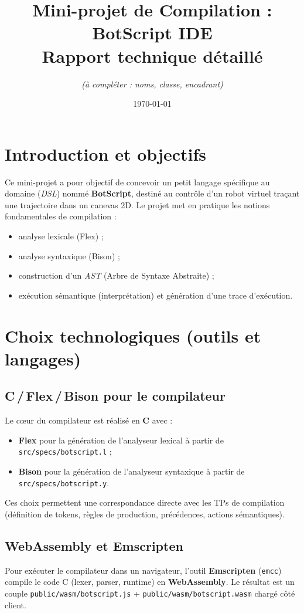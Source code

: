 \documentclass[11pt,a4paper]{article}
\title{\textbf{Mini-projet de Compilation : BotScript IDE}\\\large Rapport technique détaillé}
\author{\textit{(à compléter : noms, classe, encadrant)}}
\date{\today}
\begin{document}
\maketitle

\section{Introduction et objectifs}
Ce mini-projet a pour objectif de concevoir un petit langage spécifique au domaine (\emph{DSL}) nommé \textbf{BotScript}, destiné au contrôle d'un robot virtuel traçant une trajectoire dans un canevas 2D. Le projet met en pratique les notions fondamentales de compilation :
\begin{itemize}
  \item analyse lexicale (Flex) ;
  \item analyse syntaxique (Bison) ;
  \item construction d'un \emph{AST} (Arbre de Syntaxe Abstraite) ;
  \item exécution sémantique (interprétation) et génération d'une trace d'exécution.
\end{itemize}

\section{Choix technologiques (outils et langages)}
\subsection{C\,/\,Flex\,/\,Bison pour le compilateur}
Le cœur du compilateur est réalisé en \textbf{C} avec :
\begin{itemize}
  \item \textbf{Flex} pour la génération de l'analyseur lexical à partir de \texttt{src/specs/botscript.l} ;
  \item \textbf{Bison} pour la génération de l'analyseur syntaxique à partir de \texttt{src/specs/botscript.y}.
\end{itemize}
Ces choix permettent une correspondance directe avec les TPs de compilation (définition de tokens, règles de production, précédences, actions sémantiques).

\subsection{WebAssembly et Emscripten}
Pour exécuter le compilateur dans un navigateur, l'outil \textbf{Emscripten} (\texttt{emcc}) compile le code C (lexer, parser, runtime) en \textbf{WebAssembly}. Le résultat est un couple \texttt{public/wasm/botscript.js} + \texttt{public/wasm/botscript.wasm} chargé côté client.
\end{document}
